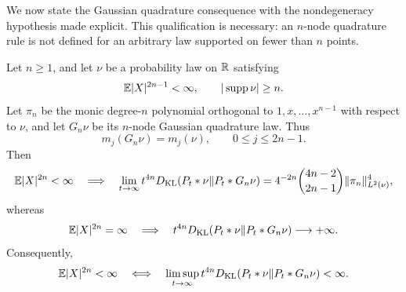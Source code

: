 We now state the Gaussian quadrature consequence with the nondegeneracy
hypothesis made explicit.  This qualification is necessary: an \(n\)-node
quadrature rule is not defined for an arbitrary law supported on fewer than
\(n\) points.

\begin{theorem}
\label{thm:gauss-poisson-kl-threshold}
Let \(n\ge1\), and let \(\nu\) be a probability law on \(\mathbb{R}\) satisfying
\[
 \mathbb{E}|X|^{2n-1}<\infty,
 \qquad |\operatorname{supp}\nu|\ge n.
\]
Let \(\pi_n\) be the monic degree-\(n\) polynomial orthogonal to
\(1,x,\ldots,x^{n-1}\) with respect to \(\nu\), and let \(G_n\nu\) be its
\(n\)-node Gaussian quadrature law.  Thus
\begin{equation}\label{eq:gauss-moment-matching}
 m_j(G_n\nu)=m_j(\nu),\qquad 0\le j\le2n-1.
\end{equation}
Then
\begin{equation}\label{eq:gauss-poisson-finite-limit}
 \mathbb{E}|X|^{2n}<\infty
 \quad\Longrightarrow\quad
 \lim_{t\to\infty}t^{4n}
 D_{\rm KL}(P_t*\nu\|P_t*G_n\nu)
 =4^{-2n}\binom{4n-2}{2n-1}
 \|\pi_n\|_{L^2(\nu)}^4,
\end{equation}
whereas
\begin{equation}\label{eq:gauss-poisson-infinite-limit}
 \mathbb{E}|X|^{2n}=\infty
 \quad\Longrightarrow\quad
 t^{4n}D_{\rm KL}(P_t*\nu\|P_t*G_n\nu)\longrightarrow+\infty.
\end{equation}
Consequently,
\begin{equation}\label{eq:gauss-poisson-moment-equivalence}
 \mathbb{E}|X|^{2n}<\infty
 \quad\Longleftrightarrow\quad
 \limsup_{t\to\infty}t^{4n}
 D_{\rm KL}(P_t*\nu\|P_t*G_n\nu)<\infty.
\end{equation}
\end{theorem}

